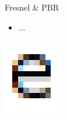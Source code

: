 \documentclass{lug}
\newcommand{\splitslide}[4]{
    \noindent
    \begin{minipage}{#1 \textwidth - #2 }
        #3
    \end{minipage}%
    \hspace{ \dimexpr #2 * 2 \relax }%
    \begin{minipage}{\textwidth - #1 \textwidth - #2 }
        #4
    \end{minipage}
}
\begin{document}
\begin{frame}{Fresnel \& PBR}
    \splitslide{0.65}{.7em}{
        \small
        \begin{itemize}
            \item ...
        \end{itemize}
    }{
        \includegraphics[width=\textwidth]{graphics/subpixel_e}
    }
\end{frame}
\end{document}
